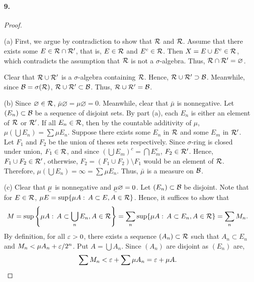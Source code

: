   \paragraph{9.}
  \begin{proof}
    $\,$\par
    (a) First, we argue by contradiction to show that $\mathcal{R}$ and 
    $\mathcal{R}$. Assume that there exists some $E\in\mathcal{R}\cap\mathcal{R}^\prime$, 
    that is, $E\in\mathcal{R}$ and $E^c\in\mathcal{R}$. Then $X=E\cup E^c\in
    \mathcal{R}$, which contradicts the assumption that $\mathcal{R}$ is not a 
    $\sigma$-algebra. Thus, $\mathcal{R}\cap\mathcal{R}^\prime=\varnothing$.\par
    Clear that $\mathcal{R}\cup\mathcal{R}^\prime$ is a $\sigma$-algebra containing 
    $\mathcal{R}$. Hence, $\mathcal{R}\cup\mathcal{R}^\prime\supset\mathcal{B}$. Meanwhile, 
    since $\mathcal{B}=\sigma(\mathcal{R})$, $\mathcal{R}\cup\mathcal{R}^\prime\subset
    \mathcal{B}$. Thus, $\mathcal{R}\cup\mathcal{R}^\prime=\mathcal{B}$.\par
    (b) Since $\varnothing\in\mathcal{R}$, $\bar{\mu}\varnothing=\mu\varnothing
    =0$. Meanwhile, clear that $\bar{\mu}$ is nonnegative. Let $(E_n)\subset 
    \mathcal{B}$ be a sequence of disjoint sets. By part (a), each $E_n$ is either 
    an element of $\mathcal{R}$ or $\mathcal{R}^\prime$. If all $E_n\in\mathcal{R}$, then by
    the countable additivity of $\mu$, $\mu(\bigcup E_n)=\sum\mu E_n$. Suppose 
    there exists some $E_n$ in $\mathcal{R}$ and some $E_m$ in $\mathcal{R}^\prime$. Let 
    $F_1$ and $F_2$ be the union of theses sets respectively. Since 
    $\sigma$-ring is closed under union, $F_1\in\mathcal{R}$, and since $(\bigcup 
    E_m)^c=\bigcap E_m^c$, $F_2\in\mathcal{R^\prime}$. Hence, $F_1\cup F_2\in\mathcal{R}
    ^\prime$, otherwise, $F_2=(F_1\cup F_2)\setminus F_1$ would be an element of 
    $\mathcal{R}$. Therefore, $\mu(\bigcup E_n)=\infty=\sum\mu E_n$. Thus, $\bar{
    \mu}$ is a measure on $\mathcal{B}$.\par
    (c) Clear that $\ubar{\mu}$ is nonnegative and $\ubar{\mu}\varnothing=0$.
    Let $(E_n)\subset\mathcal{B}$ be disjoint. Note that for $E\in\mathcal{R}$, $\mu 
    E=\sup\{\mu A:\,A\subset E,A\in\mathcal{R}\}$. Hence, it suffices to show that
    \[
      M=\sup\left\{\mu A:\, A\subset\bigcup_n E_n,A\in\mathcal{R}\right\}=
      \sum_n\sup\{\mu A:\, A\subset E_n,A\in\mathcal{R}\}=\sum_n M_n.
    \]
    By definition, for all $\varepsilon>0$, there exists a sequence $(A_n)\subset
    \mathcal{R}$ such that $A_n\subset E_n$ and $M_n<\mu A_n+\varepsilon/2^n$. Put $A=
    \bigcup A_n$. Since $(A_n)$ are disjoint as $(E_n)$ are, 
    \[
      \sum M_n < \varepsilon+\sum\mu A_n =\varepsilon+\mu A.
\]
\end{proof}
